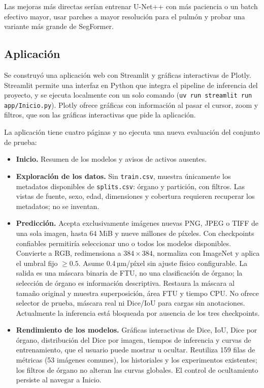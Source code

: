 \documentclass[11pt,letterpaper]{article}
\begin{document}
Las mejoras más directas serían entrenar U-Net++ con más paciencia o un batch efectivo mayor, usar
parches a mayor resolución para el pulmón y probar una variante más grande de SegFormer.

\subsection{Aplicación}

Se construyó una aplicación web con Streamlit y gráficas interactivas de Plotly. Streamlit permite
una interfaz en Python que integra el pipeline de inferencia del proyecto, y se ejecuta localmente
con un solo comando
(\texttt{uv run streamlit run app/Inicio.py}). Plotly ofrece gráficas con información al pasar el
cursor, zoom y filtros, que son las gráficas interactivas que pide la aplicación.

La aplicación tiene cuatro páginas y no ejecuta una nueva evaluación del conjunto de prueba:

\begin{itemize}
  \item \textbf{Inicio.} Resumen de los modelos y avisos de activos ausentes.
  \item \textbf{Exploración de los datos.} Sin \texttt{train.csv}, muestra únicamente los metadatos
        disponibles de \texttt{splits.csv}: órgano y partición, con filtros. Las vistas de fuente,
        sexo, edad, dimensiones y cobertura requieren recuperar los metadatos; no se inventan.
  \item \textbf{Predicción.} Acepta exclusivamente imágenes nuevas PNG, JPEG o TIFF de una sola
        imagen, hasta 64 MiB y nueve millones de píxeles. Con checkpoints confiables permitiría
        seleccionar uno o todos los modelos disponibles. Convierte a RGB, redimensiona a
        $384\times384$, normaliza con ImageNet y aplica el umbral fijo $\geq0.5$. Asume
        0.4\,µm/píxel sin ajuste físico configurable. La salida es una máscara binaria de FTU,
        no una clasificación de órgano; la selección de órgano es información descriptiva.
        Restaura la máscara al tamaño original y muestra superposición, área FTU y tiempo CPU.
        No ofrece selector de prueba, máscara real ni Dice/IoU para cargas sin anotaciones.
        Actualmente la inferencia está bloqueada por ausencia de los tres checkpoints.
  \item \textbf{Rendimiento de los modelos.} Gráficas interactivas de Dice, IoU, Dice por órgano,
        distribución del Dice por imagen, tiempos de inferencia y curvas de entrenamiento, que el
        usuario puede mostrar u ocultar. Reutiliza 159 filas de métricas (53 imágenes comunes),
        los historiales y los experimentos existentes; los filtros de órgano no alteran las curvas
        globales. El control de ocultamiento persiste al navegar a Inicio.
\end{itemize}
\end{document}
